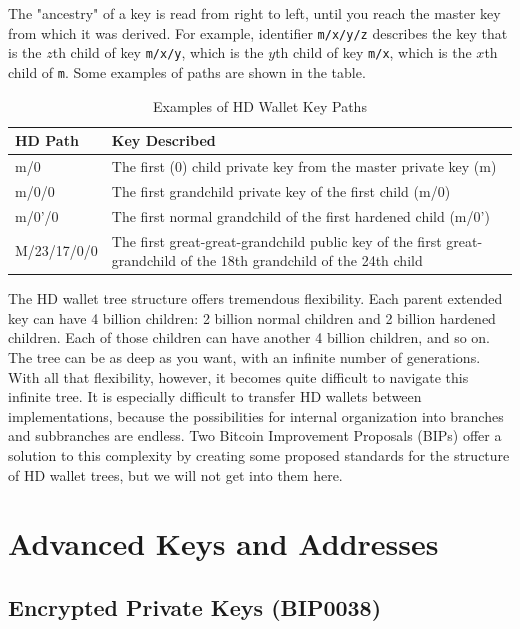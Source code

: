 \documentclass{article}
\newcounter{example}[section]
\begin{document}
    The "ancestry" of a key is read from right to left, until you reach the master key from which it was derived. For example, identifier \texttt{m/x/y/z} describes the key that is the $z$th child of key \texttt{m/x/y}, which is the $y$th child of key \texttt{m/x}, which is the $x$th child of \texttt{m}. Some examples of paths are shown in the table.

    \begin{table}[H]
    \centering
    \begin{tabular}{|l|l|}
    \hline
    \textbf{HD Path} & \textbf{Key Described} \\
    \hline
    m/0 & The first (0) child private key from the master private key (m) \\
    m/0/0 & The first grandchild private key of the first child (m/0) \\
    m/0'/0 & The first normal grandchild of the first hardened child (m/0') \\
    M/23/17/0/0 & The first great-great-grandchild public key of the first great-grandchild of the 18th grandchild of the 24th child \\
    \hline
    \end{tabular}
    \caption{Examples of HD Wallet Key Paths}
    \end{table}

    The HD wallet tree structure offers tremendous flexibility. Each parent extended key can have 4 billion children: 2 billion normal children and 2 billion hardened children. Each of those children can have another 4 billion children, and so on. The tree can be as deep as you want, with an infinite number of generations. With all that flexibility, however, it becomes quite difficult to navigate this infinite tree. It is especially difficult to transfer HD wallets between implementations, because the possibilities for internal organization into branches and subbranches are endless. Two Bitcoin Improvement Proposals (BIPs) offer a solution to this complexity by creating some proposed standards for the structure of HD wallet trees, but we will not get into them here.

\section{Advanced Keys and Addresses}

  \subsection{Encrypted Private Keys (BIP0038)}
\end{document}
